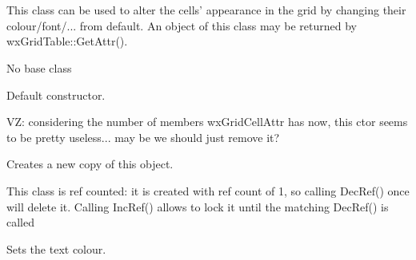 %
%

\section{}\label{wxgridcellattr}

This class can be used to alter the cells' appearance in
the grid by changing their colour/font/... from default. An object of this
class may be returned by wxGridTable::GetAttr().


No base class



\label{wxgridcellattrwxgridcellattr}


Default constructor.
            

VZ: considering the number of members wxGridCellAttr has now, this ctor
seems to be pretty useless... may be we should just remove it?

\label{wxgridcellattrclone}


Creates a new copy of this object.

\label{wxgridcellattrincref}


This class is ref counted: it is created with ref count of 1, so
calling DecRef() once will delete it. Calling IncRef() allows to lock
it until the matching DecRef() is called

\label{wxgridcellattrdecref}


\label{wxgridcellattrsettextcolour}


Sets the text colour.

